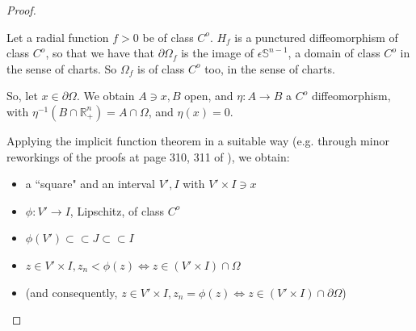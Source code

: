 \documentclass[english,a4paper,10pt,oneside]{scrbook}	%
\theoremstyle{break}
\newenvironment{mproof}[1][\proofname]{%
  \begin{proof}[#1]$ $\par\nobreak\ignorespaces
}{%
  \end{proof}
}
\renewcommand*{\proofname}{Proof}
\theoremstyle{remark}
\newcommand{\mR}{\mathbb{R}}
\newcommand{\mS}{\mathbb{S}^{n-1}}
\newcommand{\cc}{\subset\subset}
\newcommand{\eps}{\epsilon}
\begin{document}
\begin{mproof}
Let a radial function $f>0$ be of class $C^o$. $H_f$ is a punctured diffeomorphism of class $C^o$, so that we have that $\partial \Omega_f$ is the image of $\eps\mS$, a domain of class $C^o$ in the sense of charts. So $\Omega_f $ is of class $C^o$ too, in the sense of charts.


So, let $x\in \partial \Omega$. We obtain $A\ni x, B$ open, and $\eta: A\rightarrow B$ a $C^o$ diffeomorphism, with $\eta^{-1}(B\cap \mR^n_+)=A\cap \Omega$, and $\eta(x)=0$.
%
%
%
%
%
%
%
%

Applying the implicit function theorem in a suitable way (e.g. through minor reworkings of the proofs at page 310, 311 of \cite{gilardi2}), we obtain:

\begin{itemize}
	\item a ``square" and an interval $V', I$ with $V'\times I \ni x$
	\item $\phi: V'\rightarrow I$, Lipschitz, of class $C^o$
	\item $\phi(V') \cc J \cc I$
	\item $z \in V'\times I, z_n<\phi(z) \iff z \in (V'\times I)\cap \Omega$
	\item (and consequently, $z \in V'\times I, z_n=\phi(z) \iff z \in (V'\times I)\cap \partial \Omega$)
\end{itemize}



\end{mproof}
\end{document}
